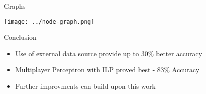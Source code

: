 \documentclass{beamer}
\begin{document}
\begin{tframe}{Graphs}
  \begin{center}
    \texttt{[image: ../node-graph.png]}
  \end{center}
 \end{tframe}

\begin{tframe}{Conclusion}
  \begin{center}
    \begin{itemize}
    \item Use of external data source provide up to 30\% better accuracy
    \item Multiplayer Perceptron with ILP proved best - 83\% Accuracy
    \item Further improvments can build upon this work  
    \end{itemize}
  \end{center}
\end{tframe}
\end{document}
